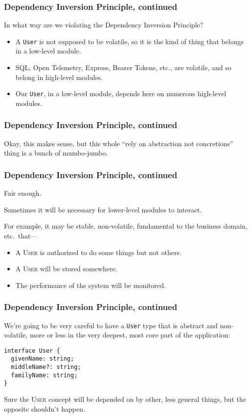\documentclass[aspectratio=169]{beamer}
\begin{document}
\begin{frame}
  \frametitle{Dependency Inversion Principle, continued}
  In what way are we violating the Dependency Inversion Principle?
  \begin{itemize}
    \item A \texttt{User} is not supposed to be volatile, so it is the kind of
          thing that belongs in a low-level module.
    \item SQL, Open Telemetry, Express, Bearer Tokens, etc., are volatile,
          and so belong in high-level modules.
    \item Our \texttt{User}, in a low-level module, depends here on numerous
          high-level modules.
  \end{itemize}
\end{frame}

\begin{frame}
  \frametitle{Dependency Inversion Principle, continued}
  Okay, this makes sense, but this whole ``rely on abstraction not concretions''
  thing is a bunch of mumbo-jumbo.
\end{frame}

\begin{frame}
  \frametitle{Dependency Inversion Principle, continued}
  Fair enough.

  \vspace{1em}

  Sometimes it will be necessary for lower-level modules to interact.

  \vspace{1em}

  For example, it may be stable, non-volatile, fundamental to the business
  domain, etc.\ that---

  \begin{itemize}
    \item A \textsc{User} is authorized to do some things but not
          others.
    \item A \textsc{User} will be stored somewhere.
    \item The performance of the system will be monitored.
  \end{itemize}
\end{frame}

\begin{frame}[fragile]
  \frametitle{Dependency Inversion Principle, continued}
  We're going to be very careful to have a \texttt{User} type that is abstract
  and non-volatile, more or less in the very deepest, most core part of the
  application:

  \vspace{1em}

  \begin{verbatim}
interface User {
  givenName: string;
  middleName?: string;
  familyName: string;
}
  \end{verbatim}

  \vspace{1em}

  Sure the \textsc{User} concept will be depended on by other, less general
  things, but the opposite shouldn't happen.
\end{frame}
\end{document}
